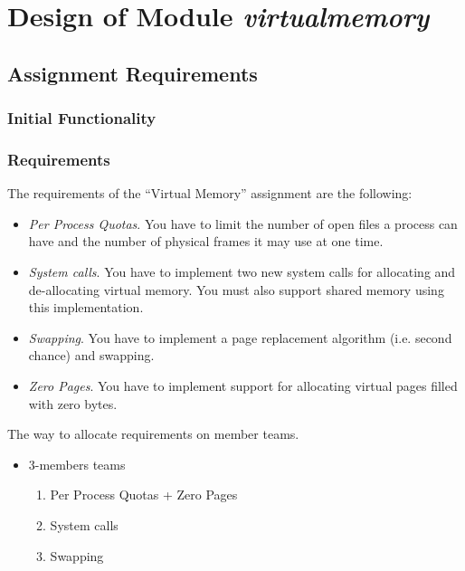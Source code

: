 
\chapter{Design of Module \textit{virtualmemory}}

\section{Assignment Requirements}


\subsection{Initial Functionality}


\subsection{Requirements}

The requirements of the ``Virtual Memory'' assignment are the following:
\begin{itemize}
    \item \textit{Per Process Quotas}. You have to limit the number of open files a process can have
and the number of physical frames it may use at one time.

    \item \textit{System calls}. You have to implement two new system calls for allocating and
de-allocating virtual memory. You must also support shared memory using this implementation.

    \item \textit{Swapping}. You have to implement a page replacement algorithm (i.e. second chance)
and swapping.

    \item \textit{Zero Pages}. You have to implement support for allocating virtual pages filled with
zero bytes.

\end{itemize}


The way to allocate requirements on member teams. 
\begin{itemize}
    \item 3-members teams
        \begin{enumerate}
            \item Per Process Quotas + Zero Pages
            \item System calls
            \item Swapping
        \end{enumerate}
\end{itemize}



